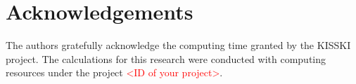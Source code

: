 \section{Acknowledgements}

The authors gratefully acknowledge the computing time granted by the KISSKI project. 
The calculations for this research were conducted with computing resources under the project \textcolor{red}{<ID of your project>}.